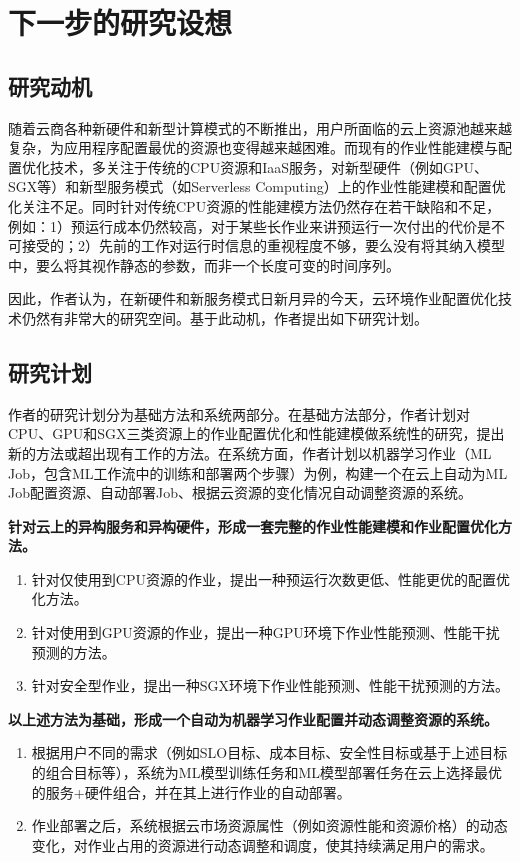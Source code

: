 \chapter{下一步的研究设想}

\section{研究动机}
随着云商各种新硬件和新型计算模式的不断推出，用户所面临的云上资源池越来越复杂，为应用程序配置最优的资源也变得越来越困难。而现有的作业性能建模与配置优化技术，多关注于传统的CPU资源和IaaS服务，对新型硬件（例如GPU、SGX等）和新型服务模式（如Serverless Computing）上的作业性能建模和配置优化关注不足。同时针对传统CPU资源的性能建模方法仍然存在若干缺陷和不足，例如：1）预运行成本仍然较高，对于某些长作业来讲预运行一次付出的代价是不可接受的；2）先前的工作对运行时信息的重视程度不够，要么没有将其纳入模型中，要么将其视作静态的参数，而非一个长度可变的时间序列。

因此，作者认为，在新硬件和新服务模式日新月异的今天，云环境作业配置优化技术仍然有非常大的研究空间。基于此动机，作者提出如下研究计划。

\section{研究计划}
作者的研究计划分为基础方法和系统两部分。在基础方法部分，作者计划对CPU、GPU和SGX三类资源上的作业配置优化和性能建模做系统性的研究，提出新的方法或超出现有工作的方法。在系统方面，作者计划以机器学习作业（ML Job，包含ML工作流中的训练和部署两个步骤）为例，构建一个在云上自动为ML Job配置资源、自动部署Job、根据云资源的变化情况自动调整资源的系统。

\textbf{针对云上的异构服务和异构硬件，形成一套完整的作业性能建模和作业配置优化方法。}
\begin{enumerate}
    \item 针对仅使用到CPU资源的作业，提出一种预运行次数更低、性能更优的配置优化方法。
    \item 针对使用到GPU资源的作业，提出一种GPU环境下作业性能预测、性能干扰预测的方法。
    \item 针对安全型作业，提出一种SGX环境下作业性能预测、性能干扰预测的方法。
\end{enumerate}

\textbf{以上述方法为基础，形成一个自动为机器学习作业配置并动态调整资源的系统。}
\begin{enumerate}
    \item 根据用户不同的需求（例如SLO目标、成本目标、安全性目标或基于上述目标的组合目标等），系统为ML模型训练任务和ML模型部署任务在云上选择最优的服务+硬件组合，并在其上进行作业的自动部署。
    \item 作业部署之后，系统根据云市场资源属性（例如资源性能和资源价格）的动态变化，对作业占用的资源进行动态调整和调度，使其持续满足用户的需求。
\end{enumerate}

